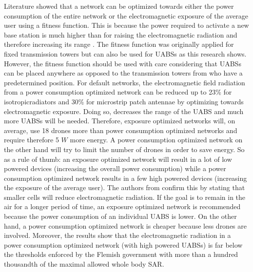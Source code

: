 Literature showed that a network can be optimized towards either the power consumption of the entire network 
or the electromagnetic exposure of the average user using a fitness function. This is because the power required to activate a new 
base station is much higher than for raising the electromagnetic radiation and therefore increasing its range \cite{J1}.
The fitness function was originally applied for fixed transmission towers but can also be used 
for \gls{UABS}s as this research shows.
However, the fitness function should be used with care considering that \gls{UABS}s can be placed anywhere as opposed to 
the transmission towers from \cite{J1} who have a predetermined position.  
For default networks, the electromagnetic field radiation from a
power consumption optimized network can be reduced up to 23\% for \gls{isotropicradiator}s and 30\% for microstrip patch antennae 
by optimizing towards electromagnetic exposure. Doing so, decreases the range of the \gls{UABS} and much more \gls{UABS}s will be needed. 
Therefore, exposure optimized networks will, on average, use 18 drones more than power consumption optimized networks
and require therefore 5 $W$ more energy.
A power consumption optimized network on the other hand will try to limit the number of drones 
in order to save energy.
 So as a rule of thumb: an exposure optimized network will result in a lot of low powered devices (increasing the overall power consumption)
while a power consumption optimized network results in a few high powered devices (increasing the exposure of the average user).
The authors from \cite{J17_kuehn2019modelling} confirm this by stating that smaller cells will reduce electromagnetic radiation. 
If the goal is to remain in the air for a longer period of time, an exposure optimized network is recommended because the power consumption of 
an individual \gls{UABS} is lower.
On the other hand, a power consumption optimized network is cheaper because less drones are involved.
Moreover, the results show that the electromagnetic radiation in a power consumption optimized network (with high powered \gls{UABS}s)
is far below the thresholds enforced by the Flemish government with more than a hundred thousandth of the maximal allowed whole body \gls{SAR}.



